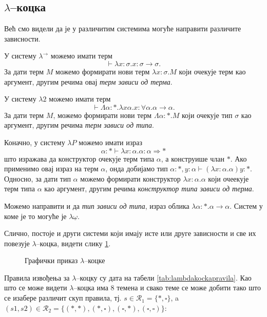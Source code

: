 \subsection{$\lambda$--коцка}

Већ смо видели да је у различитим системима могуће направити различите
зависности.

У систему $\lambda^{\to}$ можемо имати терм 
$$\vdash \lambda x: \sigma. x: \sigma \to \sigma.$$ За дати терм $M$
можемо формирати нови терм $\lambda x : \sigma. M$ који очекује терм
као аргумент, другим речима овај \emph{терм зависи од терма}.

У систему $\lambda2$ можемо имати терм 
$$\vdash \Lambda\alpha:*.\lambda x\alpha.x: \forall\alpha. \alpha \to
\alpha.$$ За дати терм $M$, можемо формирати нови терм $\Lambda
\alpha: *.M$ који очекује тип $\sigma$ као аргумент, другим речима
\emph{терм зависи од типа}.

Коначно, у систему $\lambda P$ можемо имати израз 
$$\alpha:* \vdash \lambda x:\alpha. \alpha : \alpha \Rightarrow *$$
што изражава да конструктор очекује терм типа $\alpha$, а конструише
члан $*$. Ако применимо овај израз на терм $\alpha$, онда добијамо тип
$\alpha:*, y:\alpha \vdash (\lambda x: \alpha. \alpha)y : *$. Односно,
за дати тип $\alpha$ можемо формирати конструктор $\lambda x:
\alpha. \alpha$ који очеекује терм типа $\alpha$ као аргумент, другим
речима \emph{конструктор типа зависи од терма}.

Можемо направити и да \emph{тип зависи од типа}, израз облика $\lambda
\alpha:*. \alpha \to \alpha$. Систем у коме је то могуће је
$\lambda\underline{\omega}$.

Слично, постоје и други системи који имају исте или друге зависности и
све их повезује $\lambda$--коцка, видети слику
\ref{tab:lambdakocka}. 

\begin{figure}[!ht]
\begin{center}

\end{center}
\caption{Графички приказ $\lambda$--коцке}\label{tab:lambdakocka}
\end{figure}

Правила извођења за $\lambda$--коцку су дата на табели
\ref{tab:lambdakockapravila}. Као што се може видети $\lambda$--коцка
има 8 темена и свако теме се може добити тако што се изабере различит
скуп правила, тј. $s \in \mathcal{R}_1 = \{*, \square \}$, a $(s1, s2)
\in \mathcal{R}_2 = \{(*, *), (*, \square), (\square, *), (\square,
\square) \}$:


